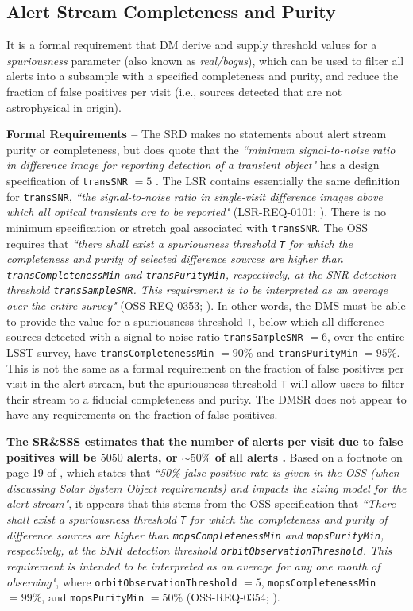 \documentclass[DM,authoryear,toc]{lsstdoc}
\begin{document}
\subsection{Alert Stream Completeness and Purity}\label{ssec:comp_pure}

It is a formal requirement that DM derive and supply threshold values for a {\it spuriousness} parameter (also known as {\it real/bogus}), which can be used to filter all alerts into a subsample with a specified completeness and purity, and reduce the fraction of false positives per visit (i.e., sources detected that are not astrophysical in origin).

{\bf Formal Requirements --} The SRD makes no statements about alert stream purity or completeness, but does quote that the {\it ``minimum signal-to-noise ratio in difference image for reporting detection of a transient object"} has a design specification of {\tt transSNR} $=5$ . The LSR contains essentially the same definition for {\tt transSNR}, {\it ``the signal-to-noise ratio in single-visit difference images above which all optical transients are to be reported"} (LSR-REQ-0101; ). There is no minimum specification or stretch goal associated with {\tt transSNR}. The OSS requires that {\it ``there shall exist a spuriousness threshold {\tt T} for which the completeness and purity of selected difference sources are higher than {\tt transCompletenessMin} and {\tt transPurityMin}, respectively, at the SNR detection threshold {\tt transSampleSNR}. This requirement is to be interpreted as an average over the entire survey"} (OSS-REQ-0353; ). In other words, the DMS must be able to provide the value for a spuriousness threshold {\tt T}, below which all difference sources detected with a signal-to-noise ratio {\tt transSampleSNR} $=6$, over the entire LSST survey, have {\tt transCompletenessMin} $=90\%$ and {\tt transPurityMin} $=95\%$. This is not the same as a formal requirement on the fraction of false positives per visit in the alert stream, but the spuriousness threshold {\tt T} will allow users to filter their stream to a fiducial completeness and purity. The DMSR does not appear to have any requirements on the fraction of false positives. 

{\bf The SR\&SSS estimates that the number of alerts per visit due to false positives will be $5050$ alerts, or $\sim50\%$ of all alerts .} Based on a footnote on page 19 of , which states that {\it ``50\% false positive rate is given in the OSS (when discussing Solar System Object requirements) and impacts the sizing model for the alert stream"}, it appears that this stems from the OSS specification that {\it ``There shall exist a spuriousness threshold {\tt T} for which the completeness and purity of difference sources are higher than {\tt mopsCompletenessMin} and {\tt mopsPurityMin}, respectively, at the SNR detection threshold {\tt orbitObservationThreshold}. This requirement is intended to be interpreted as an average for any one month of observing"}, where {\tt orbitObservationThreshold} $=5$, {\tt mopsCompletenessMin} $=99\%$, and {\tt mopsPurityMin} $=50\%$ (OSS-REQ-0354; ).
\end{document}
